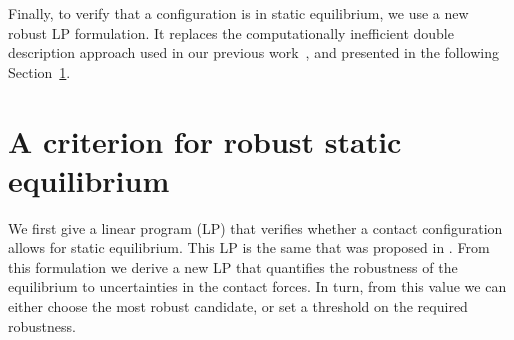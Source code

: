 \documentclass[journal]{IEEEtran}
\providecommand{\DIFaddtex}[1]{#1} %
\providecommand{\DIFadd}[1]{\texorpdfstring{\DIFaddtex{#1}}{#1}} %
\begin{document}
\DIFadd{Finally, to verify that a configuration is in static equilibrium, we use a new robust LP formulation. It replaces the computationally inefficient double description
approach used in our previous work~\cite{tonneauisrr15}, and presented in the following Section~\ref{sec:Equil}.
}





\section{\DIFadd{A criterion for robust static equilibrium}}
\label{sec:Equil}

\DIFadd{We first give a linear program (LP) that verifies whether a contact configuration allows for static equilibrium. This LP is the same that was proposed in  \citep{Prete2016}.
From this formulation we derive a new LP that quantifies the robustness of the equilibrium to uncertainties in the contact forces.
In turn, from this value we can either choose the most robust candidate, or set a threshold on the required robustness. 
}
\end{document}
